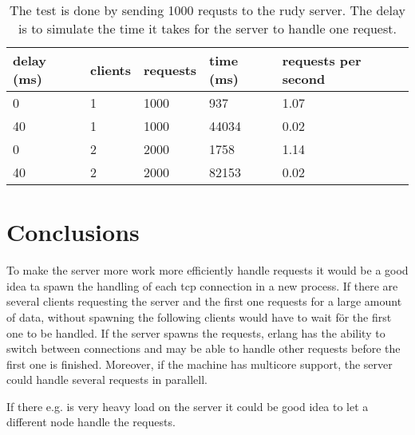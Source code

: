 \documentclass[a4paper, 11pt]{article}
\begin{document}
\begin{table}[h]
\centering
\begin{tabular}{lllll}


delay (ms) & clients &  requests  & time (ms) &requests per second  \\\hline
0          & 1       &  1000      & 937       & 1.07\\\hline
40         & 1       &  1000      & 44034     & 0.02\\\hline
0          & 2       &  2000      & 1758      & 1.14\\\hline
40         & 2       &  2000      & 82153     & 0.02\\\hline


\end{tabular}
\caption{The test is done by sending 1000 requsts to the rudy server. The delay is to simulate the time it takes for the server to handle one request.}
\label{tab:results}
\end{table}

 
\section{Conclusions}


To make the server more work more efficiently handle requests it would be a good idea ta spawn the handling of each tcp connection in a new process.
If there are several clients requesting the server and the first one requests for a large amount of data, without spawning the following clients would have to wait för the first one to be handled. 
If the server spawns the requests, erlang has the ability to switch between connections and may be able to handle other requests before the first one is finished.
Moreover, if the machine has multicore support, the server could handle several requests in parallell.

If there e.g. is very heavy load on the server it could be good idea to let a different node handle the requests.



\end{document}
